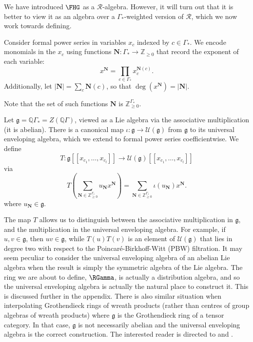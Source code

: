 We have introduced $\FHG$ as a $\mathcal{R}$-algebra. However, it will turn out that it is better to view it as an algebra over a $\Gamma_*$-weighted version of $\mathcal{R}$, which we now work towards defining.
\begin{definition}
Consider formal power series in variables $x_c$ indexed by $c \in \Gamma_*$. We encode monomials in the $x_c$ using functions $\mathbf{N}: \Gamma_* \to \mathbb{Z}_{\geq 0}$ that record the exponent of each variable:
\[
x^{\mathbf{N}} = \prod_{c \in \Gamma_*} x_c^{\mathbf{N}(c)}.
\]
Additionally, let $|\mathbf{N}| = \sum_c \mathbf{N}(c)$, so that $\deg(x^{\mathbf{N}}) = |\mathbf{N}|$.
\end{definition}

Note that the set of such functions $\mathbf{N}$ is $\mathbb{Z}_{\geq 0}^{\Gamma_*}$. 
\begin{definition}
Let $\mathfrak{g} = \mathbb{Q}\Gamma_* = Z(\mathbb{Q}\Gamma)$, viewed as a Lie algebra via the associative multiplication \textup{(}it is abelian\textup{)}. There is a canonical map $\iota: \mathfrak{g} \to \mathcal{U}(\mathfrak{g})$ from $\mathfrak{g}$ to its universal enveloping algebra, which we extend to formal power series coefficientwise. We define
\[
T: \mathfrak{g}[[x_{c_1}, \ldots, x_{c_l}]] \to \mathcal{U}(\mathfrak{g})[[x_{c_1},  \ldots, x_{c_l}]]
\]
via
\[
T\left(
\sum_{\mathbf{N} \in \mathbb{Z}_{\geq 0}^{\Gamma_*}} u_{\mathbf{N}} x^{\mathbf{N}}
\right) = \sum_{\mathbf{N} \in \mathbb{Z}_{\geq 0}^{\Gamma_*}} \iota(u_{\mathbf{N}}) x^{\mathbf{N}}.
\]
where $u_{\mathbf{N}} \in \mathfrak{g}$.
\end{definition}
\begin{remark}
The map $T$ allows us to distinguish between the associative multiplication in $\mathfrak{g}$, and the multiplication in the universal enveloping algebra. For example, if $u, v \in \mathfrak{g}$, then $uv \in \mathfrak{g}$, while $T(u)T(v)$ is an element of $\mathcal{U}(\mathfrak{g})$ that lies in degree two with respect to the Poincar\'{e}-Birkhoff-Witt (PBW) filtration. It may seem peculiar to consider the universal enveloping algebra of an abelian Lie algebra when the result is simply the symmetric algebra of the Lie algebra. The ring we are about to define, $\RGamma$, is actually a distribution algebra, and so the universal enveloping algebra is actually the natural place to construct it. This is discussed further in the appendix. There is also similar situation when interpolating Grothendieck rings of wreath products (rather than centres of group algebras of wreath products) where $\mathfrak{g}$ is the Grothendieck ring of a tensor category. In that case, $\mathfrak{g}$ is not necessarily abelian and the universal enveloping algebra is the correct construction. The interested reader is directed to \cite{Ryba1} and \cite{Ryba2}.
\end{remark}
